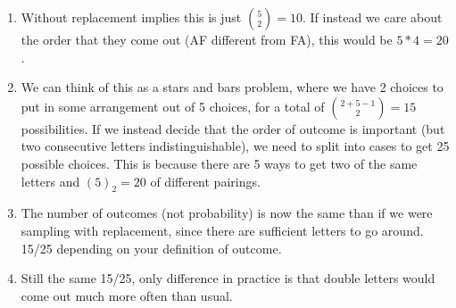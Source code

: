 \documentclass{article}
\begin{document}
\begin{prob}
	\begin{enumerate}
		\item Without replacement implies this is just ${5 \choose 2}=10$. If instead we care about the order that they come out (AF different from FA), this would be $5*4=20$.

		\item We can think of this as a stars and bars problem, where we have 2 choices to put in some arrangement out of 5 choices, for a total of ${2+5-1 \choose 2}= 15$ possibilities.
		If we instead decide that the order of outcome is important (but two consecutive letters indistinguishable), we need to split into cases to get 25 possible choices.
		This is because there are 5 ways to get two of the same letters and $(5)_2=20$ of different pairings.

		\item The number of outcomes (not probability) is now the same than if we were sampling with replacement, since there are sufficient letters to go around. 15/25 depending on your definition of outcome.

		\item Still the same 15/25, only difference in practice is that double letters would come out much more often than usual.
	\end{enumerate}
\end{prob}
\end{document}
